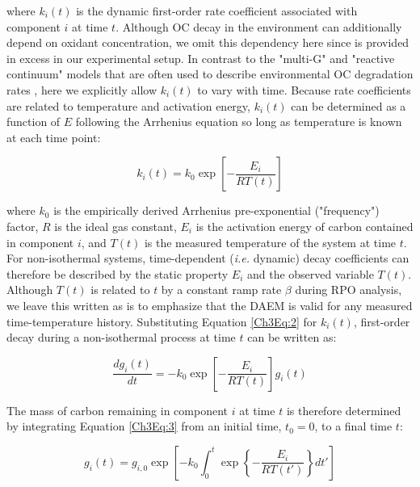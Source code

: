 where $k_{i}(t)$ is the dynamic first-order rate coefficient associated with component $i$ at time $t$. Although OC decay in the environment can additionally depend on oxidant concentration, we omit this dependency here since  is provided in excess in our experimental setup. In contrast to the "multi-G" and "reactive continuum" models that are often used to describe environmental OC degradation rates \citep{Westrich:1984uj,Boudreau:1991wf,Forney:2012dr,Forney:2012hz}, here we explicitly allow $k_{i}(t)$ to vary with time. Because rate coefficients are related to temperature and activation energy, $k_{i}(t)$ can be determined as a function of $E$ following the Arrhenius equation so long as temperature is known at each time point:

\begin{equation}\label{Ch3Eq:2}
	k_{i}(t) = k_{0} \exp \left[ - \frac{E_{i}}{RT(t)} \right]
\end{equation}

where $k_0$ is the empirically derived Arrhenius pre-exponential ("frequency") factor, $R$ is the ideal gas constant, $E_{i}$ is the activation energy of carbon contained in component $i$, and $T(t)$ is the measured temperature of the system at time $t$. For non-isothermal systems, time-dependent (\textit{i.e.} dynamic) decay coefficients can therefore be described by the static property $E_{i}$ and the observed variable $T(t)$. Although $T(t)$ is related to $t$ by a constant ramp rate $\beta$ during RPO analysis, we leave this written as is to emphasize that the DAEM is valid for any measured time-temperature history. Substituting Equation \ref{Ch3Eq:2} for $k_{i}(t)$, first-order decay during a non-isothermal process at time $t$ can be written as:

\begin{equation}\label{Ch3Eq:3}
	\frac{dg_{i}(t)}{dt} = - k_{0} \exp \left[ - \frac{E_{i}}{RT(t)} \right] g_{i}(t)
\end{equation}

The mass of carbon remaining in component $i$ at time $t$ is therefore determined by integrating Equation \ref{Ch3Eq:3} from an initial time, $t_{0} = 0$, to a final time $t$:

\begin{equation}\label{Ch3Eq:4}
	g_{i}(t) = g_{i,0} \exp \left[ - k_{0} \int_{0}^{t} \exp \left\{ - \frac{E_{i}}{RT(t')} \right\} dt' \right]
\end{equation}

